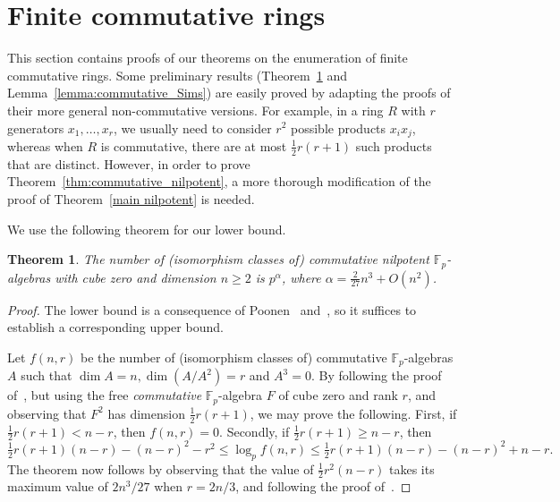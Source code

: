 \documentclass[12pt]{article}
\newtheorem{Thm}{Theorem}[section]
\begin{document}
\section{Finite commutative rings}
\label{sec:commutative}

This section contains proofs of our theorems on the enumeration of finite commutative rings. Some preliminary results (Theorem~\ref{thm:commutative_nilpotent_lower} and Lemma~\ref{lemma:commutative_Sims}) are easily proved by adapting the proofs of their more general non-commutative versions. For example, in a ring $R$ with $r$ generators $x_{1}, \ldots, x_{r}$, we usually need to consider $r^{2}$ possible products $x_{i}x_{j}$, whereas when $R$ is commutative, there are at most $\frac{1}{2}r(r + 1)$ such products that are distinct. However, in order to prove Theorem~\ref{thm:commutative_nilpotent}, a more thorough modification of the proof of Theorem~\ref{main nilpotent} is needed. 

We use the following theorem for our lower bound. 

\begin{Thm}
\label{thm:commutative_nilpotent_lower}
The number of (isomorphism classes of) commutative nilpotent $\mathbb{F}_{p}$-algebras with cube zero and dimension $n \geq 2$ is $p^{\alpha}$, where $\alpha = \frac{2}{27}n^{3} + O(n^{2})$. 
\end{Thm}
\begin{proof}
The lower bound is a consequence of Poonen~\cite[Lemma~9.1]{Poonen} and~\cite[Theorem~9.2]{Poonen}, so it suffices to establish a corresponding upper bound.

Let $f(n, r)$ be the number of (isomorphism classes of) commutative $\mathbb{F}_{p}$-algebras $A$ such that $\dim A = n, \dim (A/A^{2}) = r$ and $A^{3} = 0$. By following the proof of~\cite[Theorem~2.1]{K & P}, but using the free \emph{commutative} $\mathbb{F}_{p}$-algebra $F$ of cube zero and rank $r$, and observing that $F^2$ has dimension $\frac{1}{2}r(r+1)$, we may prove the following. First, if $\frac{1}{2}r(r + 1) < n - r$, then $f(n, r) = 0$. Secondly, if $\frac{1}{2}r(r + 1) \geq n - r$, then
\begin{displaymath}
\tfrac{1}{2}r(r + 1)(n - r) - (n - r)^{2} - r^{2} \leq \log_{p}f(n, r) \leq \tfrac{1}{2}r(r + 1)(n - r) - (n - r)^{2} + n - r. 
\end{displaymath}
The theorem now follows by observing that the value of $\frac{1}{2}r^2(n-r)$ takes its maximum value of $2n^3/27$ when $r=2n/3$, and following the proof of~\cite[Theorem~2.2]{K & P}.
\end{proof}
\end{document}
